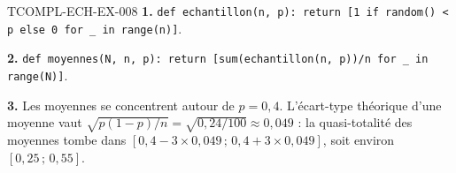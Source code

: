 % 
% 
% 
\begin{corrige}{TCOMPL-ECH-EX-008}
\textbf{1.} \texttt{def echantillon(n, p): return [1 if random() < p else 0
for \_ in range(n)]}.

\textbf{2.} \texttt{def moyennes(N, n, p): return [sum(echantillon(n, p))/n
for \_ in range(N)]}.

\textbf{3.} Les moyennes se concentrent autour de $p=0{,}4$. L'écart-type
théorique d'une moyenne vaut
$\sqrt{p(1-p)/n}=\sqrt{0{,}24/100}\approx0{,}049$ : la quasi-totalité des
moyennes tombe dans $[0{,}4-3\times0{,}049\,;\,0{,}4+3\times0{,}049]$, soit
environ $[0{,}25\,;\,0{,}55]$.
\end{corrige}

